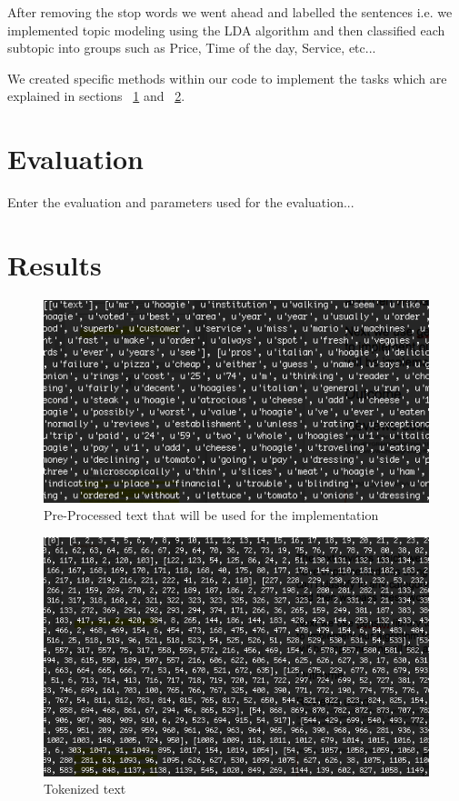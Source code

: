 \documentclass{article}
\begin{document}
	After removing the stop words we went ahead and labelled the sentences i.e. we implemented topic modeling using the 	LDA algorithm and then classified each subtopic into groups such as Price, Time of the day, Service, etc...
	  
	 We created specific methods within our code to implement the tasks which are explained in sections ~\ref{eval} and ~\ref{result}. 
	
\section{Evaluation} 
	\label{eval} 

	Enter the evaluation and parameters used for the evaluation...

\section{Results} 
	\label{result} 

\begin{figure}[ht]
	\centerline{\includegraphics[width=\columnwidth]{preproctext}}
	\caption{Pre-Processed text that will be used for the implementation}
	\label{preproctext}
	\vskip 0.15in
\end{figure} 

\begin{figure}[ht]
	\centerline{\includegraphics[width=\columnwidth]{tokenized}}
	\caption{Tokenized text}
	\label{tokenized}
	\vskip 0.15in
\end{figure} 
\end{document}
